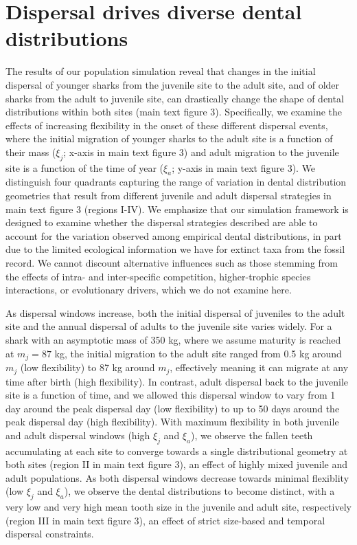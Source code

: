 \documentclass[]{rsos}%
\begin{document}
\section{Dispersal drives diverse dental distributions}
The results of our population simulation reveal that changes in the initial dispersal of younger sharks from the juvenile site to the adult site, and of older sharks from the adult to juvenile site, can drastically change the shape of dental distributions within both sites (main text figure 3).
Specifically, we examine the effects of increasing flexibility in the onset of these different dispersal events, where the initial migration of younger sharks to the adult site is a function of their mass ($\xi_j$; x-axis in main text figure 3) and adult migration to the juvenile site is a function of the time of year ($\xi_a$; y-axis in main text figure 3).
We distinguish four quadrants capturing the range of variation in dental distribution geometries that result from different juvenile and adult dispersal strategies in main text figure 3 (regions I-IV).
We emphasize that our simulation framework is designed to examine whether the dispersal strategies described are able to account for the variation observed among empirical dental distributions, in part due to the limited ecological information we have for extinct taxa from the fossil record.
We cannot discount alternative influences such as those stemming from the effects of intra- and inter-specific competition, higher-trophic species interactions, or evolutionary drivers, which we do not examine here.


As dispersal windows increase, both the initial dispersal of juveniles to the adult site and the annual dispersal of adults to the juvenile site varies widely.
For a shark with an asymptotic mass of 350 kg, where we assume maturity is reached at $m_j = 87$ kg, the initial migration to the adult site ranged from 0.5 kg around $m_j$ (low flexibility) to 87 kg around $m_j$, effectively meaning it can migrate at any time after birth (high flexibility).
In contrast, adult dispersal back to the juvenile site is a function of time, and we allowed this dispersal window to vary from 1 day around the peak dispersal day (low flexibility) to up to 50 days around the peak dispersal day (high flexibility).
With maximum flexibility in both juvenile and adult dispersal windows (high $\xi_j$ and $\xi_a$), we observe the fallen teeth accumulating at each site to converge towards a single distributional geometry at both sites (region II in main text figure 3), an effect of highly mixed juvenile and adult populations.
As both dispersal windows decrease towards minimal flexiblity (low $\xi_j$ and $\xi_a$), we observe the dental distributions to become distinct, with a very low and very high mean tooth size in the juvenile and adult site, respectively (region III in main text figure 3), an effect of strict size-based and temporal dispersal constraints.
\end{document}
